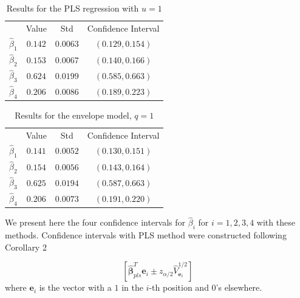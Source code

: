 \documentclass{article}
\theoremstyle{definition}
\renewcommand{\b}[1]{{\boldsymbol #1}}
\newcommand{\wbb}{\widehat{\boldsymbol{\beta}}}
\begin{document}
\begin{table}[ht]
	\centering
	\caption{Results for the PLS regression with $u=1$}
	\begin{tabular}[t]{lccc}
		\hline
		&Value&Std & Confidence Interval \\
		$\widehat{\beta}_1$&$0.142$&$0.0063$& $(0.129, 0.154)$\\
		$\widehat{\beta}_2$&$0.153$&$0.0067$& $(0.140, 0.166)$\\
		$\widehat{\beta}_3$&$0.624$&$0.0199$& $(0.585, 0.663)$\\
		$\widehat{\beta}_4$&$0.206$&$0.0086$& $(0.189, 0.223)$\\
		\hline
	\end{tabular}
\end{table}

\begin{table}[ht]
	\centering
	\caption{Results for the envelope model, $q=1$}
	\begin{tabular}[t]{lccc}
		\hline
		&Value&Std & Confidence Interval \\
		$\widehat{\beta}_1$&$0.141$&$0.0052$& $(0.130, 0.151)$\\
		$\widehat{\beta}_2$&$0.154$&$0.0056$& $(0.143, 0.164)$\\
		$\widehat{\beta}_3$&$0.625$&$0.0194$& $(0.587, 0.663)$\\
		$\widehat{\beta}_4$&$0.206$&$0.0073$& $(0.191, 0.220)$\\
		\hline
	\end{tabular}
\end{table}

 We present here the four confidence intervals for $\widehat{\beta}_i$ for $i=1,2,3,4$ with these methods. Confidence intervals with PLS method were constructed following Corollary 2

\begin{equation*}
	\left[\wbb_{pls}^T \b{e}_i \pm z_{\alpha/2} \widehat{V}_{\b{e}_i}^{1/2} \right]
\end{equation*}
where $\b{e}_i$ is the vector with a $1$ in the $i$-th position and $0$'s elsewhere.
\end{document}
